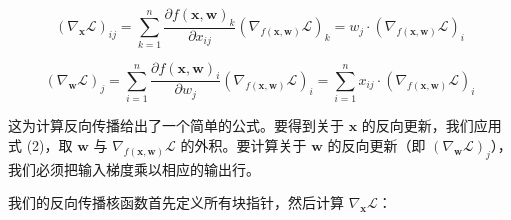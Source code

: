 \begin{equation}
(\nabla_{\boldsymbol{x}} \mathcal{L})_{ij} = \sum_{k=1}^{n} \frac{\partial f(\boldsymbol{x}, \boldsymbol{w})_k}{\partial x_{ij}} \left( \nabla_{f(\boldsymbol{x},\boldsymbol{w})} \mathcal{L} \right)_{\!k} = w_j \cdot \left( \nabla_{f(\boldsymbol{x},\boldsymbol{w})} \mathcal{L} \right)_{\!i}
\end{equation}

\begin{equation}
(\nabla_{\boldsymbol{w}} \mathcal{L})_{j} = \sum_{i=1}^{n} \frac{\partial f(\boldsymbol{x}, \boldsymbol{w})_i}{\partial w_{j}} \left( \nabla_{f(\boldsymbol{x},\boldsymbol{w})} \mathcal{L} \right)_{\!i} = \sum_{i=1}^{n} x_{ij} \cdot \left( \nabla_{f(\boldsymbol{x},\boldsymbol{w})} \mathcal{L} \right)_{\!i}
\end{equation}

这为计算反向传播给出了一个简单的公式。要得到关于 $\boldsymbol{x}$ 的反向更新，我们应用式 (2)，取 $\boldsymbol{w}$ 与 $\nabla_{f(\boldsymbol{x},\boldsymbol{w})}\mathcal{L}$ 的外积。要计算关于 $\boldsymbol{w}$ 的反向更新（即 $(\nabla_{\boldsymbol{w}}\mathcal{L})_j$），我们必须把输入梯度乘以相应的输出行。

我们的反向传播核函数首先定义所有块指针，然后计算 $\nabla_{\boldsymbol{x}}\mathcal{L}$：

